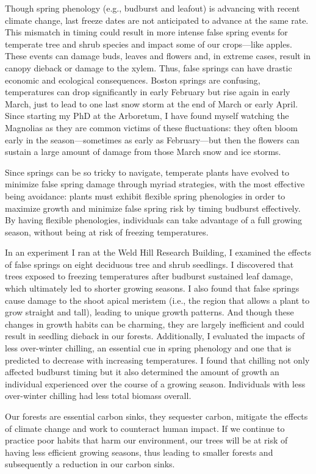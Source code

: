 \documentclass{article}\usepackage[]{graphicx}\usepackage[]{color}
\begin{document}
Though spring phenology (e.g., budburst and leafout) is advancing with recent climate change, last freeze dates are not anticipated to advance at the same rate. This mismatch in timing could result in more intense false spring events for temperate tree and shrub species and impact some of our crops---like apples. These events can damage buds, leaves and flowers and, in extreme cases, result in canopy dieback or damage to the xylem. Thus, false springs can have drastic economic and ecological consequences. Boston springs are confusing, temperatures can drop significantly in early February but rise again in early March, just to lead to one last snow storm at the end of March or early April. Since starting my PhD at the Arboretum, I have found myself watching the Magnolias as they are common victims of these fluctuations: they often bloom early in the season---sometimes as early as February---but then the flowers can sustain a large amount of damage from those March snow and ice storms. 

Since springs can be so tricky to navigate, temperate plants have evolved to minimize false spring damage through myriad strategies, with the most effective being avoidance: plants must exhibit flexible spring phenologies in order to maximize growth and minimize false spring risk by timing budburst effectively. By having flexible phenologies, individuals can take advantage of a full growing season, without being at risk of freezing temperatures.

In an experiment I ran at the Weld Hill Research Building, I examined the effects of false springs on eight deciduous tree and shrub seedlings. I discovered that trees exposed to freezing temperatures after budburst sustained leaf damage, which ultimately led to shorter growing seasons. I also found that false springs cause damage to the shoot apical meristem (i.e., the region that allows a plant to grow straight and tall), leading to unique growth patterns. And though these changes in growth habits can be charming, they are largely inefficient and could result in seedling dieback in our forests. Additionally, I evaluated the impacts of less over-winter chilling, an essential cue in spring phenology and one that is predicted to decrease with increasing temperatures. I found that chilling not only affected budburst timing but it also determined the amount of growth an individual experienced over the course of a growing season. Individuals with less over-winter chilling had less total biomass overall. 

Our forests are essential carbon sinks, they sequester carbon, mitigate the effects of climate change and work to counteract human impact. If we continue to practice poor habits that harm our environment, our trees will be at risk of having less efficient growing seasons, thus leading to smaller forests and subsequently a reduction in our carbon sinks. 


\end{document}
